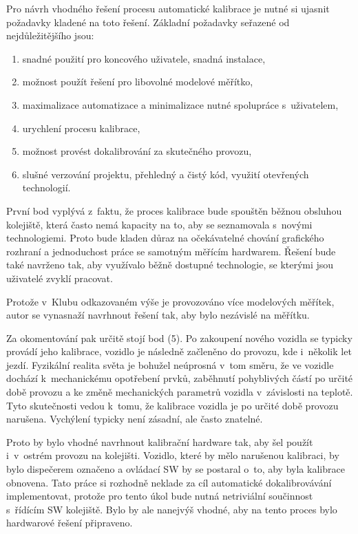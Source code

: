 Pro návrh vhodného řešení procesu automatické kalibrace je nutné si ujasnit
požadavky kladené na toto řešení. Základní požadavky seřazené od
nejdůležitějšího jsou:

\begin{enumerate}
	\item snadné použití pro koncového uživatele, snadná instalace,
	\item možnost použít řešení pro libovolné modelové měřítko,
	\item maximalizace automatizace a minimalizace nutné spolupráce s~uživatelem,
	\item urychlení procesu kalibrace,
	\item možnost provést dokalibrování za skutečného provozu,
	\item slušné verzování projektu, přehledný a čistý kód, využití otevřených
	technologií.
\end{enumerate}

První bod vyplývá z~faktu, že proces kalibrace bude spouštěn běžnou obsluhou
kolejiště, která často nemá kapacity na to, aby se seznamovala s~novými
technologiemi. Proto bude kladen důraz na očekávatelné chování grafického
rozhraní a jednoduchost práce se samotným měřícím hardwarem. Řešení bude také
navrženo tak, aby využívalo běžně dostupné technologie, se kterými jsou
uživatelé zvyklí pracovat.

Protože v~Klubu odkazovaném výše je provozováno více modelových měřítek, autor
se vynasnaží navrhnout řešení tak, aby bylo nezávislé na měřítku.

Za okomentování pak určitě stojí bod (5). Po zakoupení nového vozidla se
typicky provádí jeho kalibrace, vozidlo je následně začleněno do provozu, kde
i~několik let jezdí. Fyzikální realita světa je bohužel neúprosná v~tom směru,
že ve vozidle dochází k~mechanickému opotřebení prvků, zaběhnutí pohyblivých
částí po určité době provozu a ke změně mechanických parametrů vozidla
v~závislosti na teplotě. Tyto skutečnosti vedou k~tomu, že kalibrace vozidla
je po určité době provozu narušena. Vychýlení typicky není zásadní, ale často
znatelné.

Proto by bylo vhodné navrhnout kalibrační hardware tak, aby šel použít
i~v~ostrém provozu na kolejišti. Vozidlo, které by mělo narušenou kalibraci,
by bylo dispečerem označeno a ovládací SW by se postaral o~to, aby byla
kalibrace obnovena. Tato práce si rozhodně neklade za cíl automatické
dokalibrovávání implementovat, protože pro tento úkol bude nutná netriviální
součinnost s~řídícím SW kolejiště. Bylo by ale nanejvýš vhodné, aby na tento
proces bylo hardwarové řešení připraveno.
